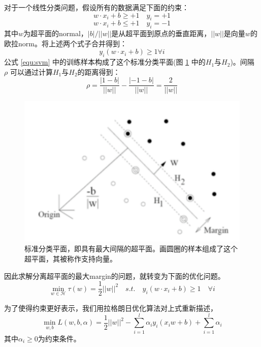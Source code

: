 对于一个线性分类问题，假设所有的数据满足下面的约束：
\begin{equation}
	w\cdot x_i +b \geq + 1 \quad y_i = +1
	\label{equ:constraint1}
\end{equation}
\begin{equation}
	w\cdot x_i +b \leq + 1 \quad y_i = -1
	\label{equ:constraint2}	
\end{equation}
其中$w$为超平面的normal，$|b|/||w||$是从超平面到原点的垂直距离，$||w||$是向量$w$的欧拉norm。将上述两个式子合并得到：
\begin{equation}
	y_i(w\cdot x_i+b)\geq 1 \forall i
	\label{equ:svm}
\end{equation}
公式 \ref{equ:svm} 中的训练样本构成了这个标准分类平面(图 \ref{fig:hyperplanes} 中的$H_1$与$H_2$)。间隔 $\rho$ 可以通过计算$H_1$与$H_2$的距离得到：
\begin{equation}
	\rho=\frac{|1-b|}{||w||}-\frac{|-1-b|}{||w||}=\frac{2}{||w||}
\end{equation}
\begin{figure}[H]
	\centering
	\includegraphics[width=\textwidth]{figures/hyperplanes}
	\caption{标准分类平面，即具有最大间隔的超平面。画圆圈的样本组成了这个超平面，其被称作支持向量。}
	\label{fig:hyperplanes}
\end{figure}
因此求解分离超平面的最大margin的问题，就转变为下面的优化问题。
\begin{equation}
	\min \limits_{w\in \mathcal{H}} \tau(w)=\frac{1}{2}||w||^2\quad s.t. \quad y_i(w\cdot x_i +b) \geq 1 \quad \forall i
	\label{equ:optimization}
\end{equation}

为了使得约束更好表示，我们用拉格朗日优化算法对上式重新描述，
\begin{equation}
	\min \limits_{w,b} L(w,b,\alpha)=\frac{1}{2}||w||^2-\sum_{i=1}^l\alpha_i y_i (x_i w + b) + \sum_{i=1}^l{\alpha_i}
	\label{equ:lagrange}
\end{equation}
其中$\alpha_i \geq 0$为约束条件。

